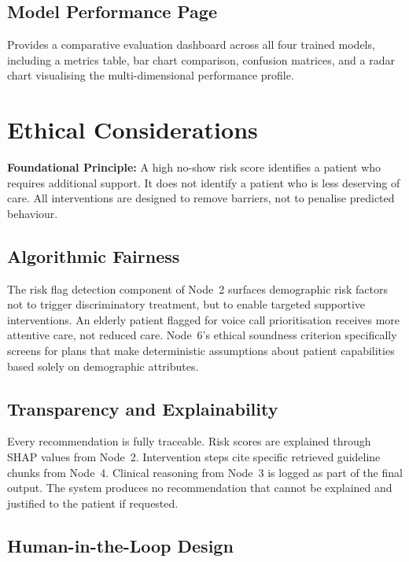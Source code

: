 \documentclass[12pt, a4paper]{report}
\begin{document}
\subsection{Model Performance Page}

Provides a comparative evaluation dashboard across all four trained models, including a metrics table, bar chart comparison, confusion matrices, and a radar chart visualising the multi-dimensional performance profile.

\section{Ethical Considerations}

\begin{infobox}
\textbf{Foundational Principle:} A high no-show risk score identifies a patient who requires additional support. It does not identify a patient who is less deserving of care. All interventions are designed to remove barriers, not to penalise predicted behaviour.
\end{infobox}

\subsection{Algorithmic Fairness}

The risk flag detection component of Node~2 surfaces demographic risk factors not to trigger discriminatory treatment, but to enable targeted supportive interventions. An elderly patient flagged for voice call prioritisation receives more attentive care, not reduced care. Node~6's ethical soundness criterion specifically screens for plans that make deterministic assumptions about patient capabilities based solely on demographic attributes.

\subsection{Transparency and Explainability}

Every recommendation is fully traceable. Risk scores are explained through SHAP values from Node~2. Intervention steps cite specific retrieved guideline chunks from Node~4. Clinical reasoning from Node~3 is logged as part of the final output. The system produces no recommendation that cannot be explained and justified to the patient if requested.

\subsection{Human-in-the-Loop Design}
\end{document}
